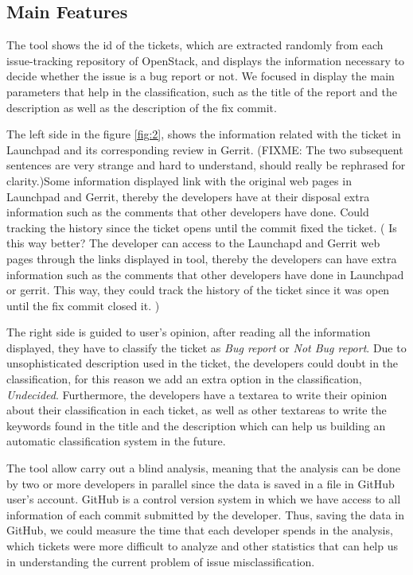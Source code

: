 \documentclass[runningheads,a4paper]{llncs}
\begin{document}
\subsection{Main Features}
\label{sec:2.2}
The tool shows the id of the tickets, which are extracted randomly from each issue-tracking repository of OpenStack, and displays the information necessary to decide whether the issue is a bug report or not. We focused in display the main parameters that help in the classification, such as the title of the report and the description as well as the description of the fix commit.

The left side in the figure \ref{fig:2}, shows the information related with the ticket in Launchpad and its corresponding review in Gerrit. (FIXME: The two subsequent sentences are very strange and hard to understand, should really be rephrased for clarity.)Some information displayed link with the original web pages in Launchpad and Gerrit, thereby the developers have at their disposal extra information such as the comments that other developers have done. Could tracking the history since the ticket opens until the commit fixed the ticket. ( Is this way better? The developer can access to the Launchapd and Gerrit web pages through the links displayed in tool, thereby the developers can have extra information such as the comments that other developers have done in Launchpad or gerrit. This way, they could track the history of the ticket since it was open until the fix commit closed it. )

The right side is guided to user's opinion, after reading all the information displayed, they have to classify the ticket as \textit{Bug report} or \textit{Not Bug report}. Due to unsophisticated description used in the ticket, the developers could doubt in the classification, for this reason we add an extra option in the classification, \textit{Undecided}. Furthermore, the developers have a textarea to write their opinion about their classification in each ticket, as well as other textareas to write the keywords found in the title and the description which can help us building an automatic classification system in the future.

The tool allow carry out a blind analysis, meaning that the analysis can be done by two or more developers in parallel since the data is saved in a file in GitHub user's account. GitHub is a control version system in which we have access to all information of each commit submitted by the developer. Thus, saving the data in GitHub, we could measure the time that each developer spends in the analysis, which tickets were more difficult to analyze and other statistics that can help us in understanding the current problem of issue misclassification.
\end{document}
